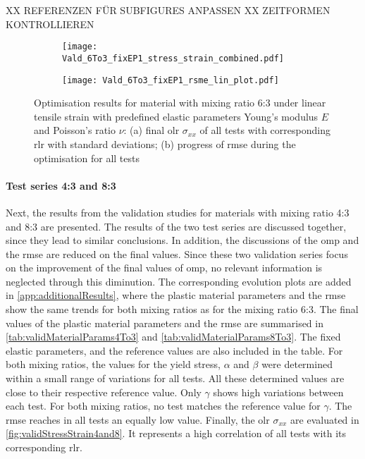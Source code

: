 XX REFERENZEN FÜR SUBFIGURES ANPASSEN
XX ZEITFORMEN KONTROLLIEREN
\begin{figure}[H]
\centering
\begin{subfigure}[t]{0.495\textwidth}
    \centering
    \texttt{[image: Vald\_6To3\_fixEP1\_stress\_strain\_combined.pdf]}
    \caption{}
    \label{fig:validStressStrain6to3}
\end{subfigure}
\hfill
\begin{subfigure}[t]{0.495\textwidth}
    \centering
    \centering
    \texttt{[image: Vald\_6To3\_fixEP1\_rsme\_lin\_plot.pdf]}
    \caption{}
    \label{fig:validRMSE6to3}
\end{subfigure}
\caption{Optimisation results for material with mixing ratio 6:3 under linear tensile strain with predefined elastic parameters Young's modulus $E$ and Poisson's ratio $\nu$: (a) final \acrlong{olr} $\sigma_{xx}$ of all tests with corresponding \acrfull{rlr} with standard deviations; (b) progress of \acrfull{rmse} during the optimisation for all tests}
\label{fig:validRes6to3}
\end{figure}





\paragraph{Test series 4:3 and 8:3}
Next, the results from the validation studies for materials with mixing ratio 4:3 and 8:3 are presented. The results of the two test series are discussed together, since they lead to similar conclusions. In addition, the discussions of the \acrlong{omp} and the \acrshort{rmse} are reduced on the final values.  Since these two validation series focus on the improvement of the final values of \acrlong{omp}, no relevant information is neglected through this diminution.
The corresponding evolution plots are added in \autoref{app:additionalResults}, where the plastic material parameters and the \acrshort{rmse} show the same trends for both mixing ratios as for the mixing ratio 6:3.
The final values of the plastic material parameters and the \acrshort{rmse} are summarised in \autoref{tab:validMaterialParams4To3} and \autoref{tab:validMaterialParams8To3}.
The fixed elastic parameters, and the reference values are also included in the table.
For both mixing ratios, the values for the yield stress, $\alpha$ and $\beta$ were determined within a small range of variations for all tests. All these determined values are close to their respective reference value.
Only $\gamma$ shows high variations between each test. For both mixing ratios, no test matches the reference value for $\gamma$. The \acrshort{rmse} reaches in all tests an equally low value. Finally, the \acrlong{olr} $\sigma_{xx}$ are evaluated in \autoref{fig:validStressStrain4and8}. It represents a high correlation of all tests with its corresponding \acrlong{rlr}.

